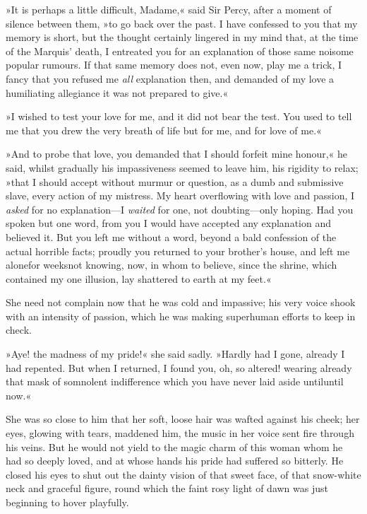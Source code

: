 »It is perhaps a little difficult, Madame,« said Sir Percy, after a moment of silence between them, »to go back over the past. I have confessed to you that my memory is short, but the thought certainly lingered in my mind that, at the time of the Marquis' death, I entreated you for an explanation of those same noisome popular rumours. If that same memory does not, even now, play me a trick, I fancy that you refused me \textit{all} explanation then, and demanded of my love a humiliating allegiance it was not prepared to give.«

»I wished to test your love for me, and it did not bear the test. You used to tell me that you drew the very breath of life but for me, and for love of me.«

»And to probe that love, you demanded that I should forfeit mine honour,« he said, whilst gradually his impassiveness seemed to leave him, his rigidity to relax; »that I should accept without murmur or question, as a dumb and submissive slave, every action of my mistress. My heart overflowing with love and passion, I \textit{asked} for no explanation—I \textit{waited} for one, not doubting—only hoping. Had you spoken but one word, from you I would have accepted any explanation and believed it. But you left me without a word, beyond a bald confession of the actual horrible facts; proudly you returned to your brother's house, and left me alone\textellipsis \allowbreak  for weeks\textellipsis \allowbreak  not knowing, now, in whom to believe, since the shrine, which contained my one illusion, lay shattered to earth at my feet.«

She need not complain now that he was cold and impassive; his very voice shook with an intensity of passion, which he was making superhuman efforts to keep in check.

»Aye! the madness of my pride!« she said sadly. »Hardly had I gone, already I had repented. But when I returned, I found you, oh, so altered! wearing already that mask of somnolent indifference which you have never laid aside until\textellipsis \allowbreak  until now.«

She was so close to him that her soft, loose hair was wafted against his cheek; her eyes, glowing with tears, maddened him, the music in her voice sent fire through his veins. But he would not yield to the magic charm of this woman whom he had so deeply loved, and at whose hands his pride had suffered so bitterly. He closed his eyes to shut out the dainty vision of that sweet face, of that snow-white neck and graceful figure, round which the faint rosy light of dawn was just beginning to hover playfully.

